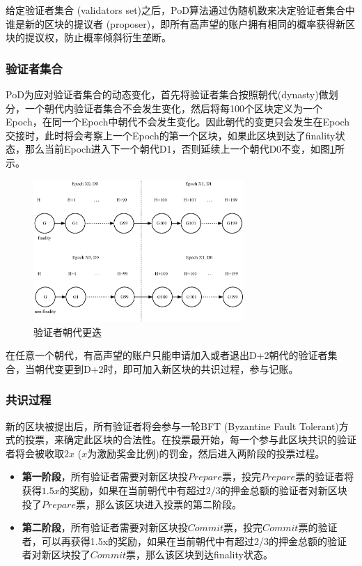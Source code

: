 给定验证者集合 (validators set)之后，PoD算法通过伪随机数来决定验证者集合中谁是新的区块的提议者 (proposer)，即所有高声望的账户拥有相同的概率获得新区块的提议权，防止概率倾斜衍生垄断。

\subsubsection{验证者集合}
\label{PoD:design:validators}

PoD为应对验证者集合的动态变化，首先将验证者集合按照朝代(dynasty)做划分，一个朝代内验证者集合不会发生变化，然后将每100个区块定义为一个Epoch，在同一个Epoch中朝代不会发生变化。因此朝代的变更只会发生在Epoch交接时，此时将会考察上一个Epoch的第一个区块，如果此区块到达了finality状态，那么当前Epoch进入下一个朝代D1，否则延续上一个朝代D0不变，如图\ref{fig:epoch}所示。

\begin{figure}[h]
\centering
\includegraphics[width=8cm]{./figs/epoch}
\caption{验证者朝代更迭}
\label{fig:epoch}
\end{figure}

在任意一个朝代，有高声望的账户只能申请加入或者退出D+2朝代的验证者集合，当朝代变更到D+2时，即可加入新区块的共识过程，参与记账。

\subsubsection{共识过程}
\label{PoD:design:consensus}

新的区块被提出后，所有验证者将会参与一轮BFT (Byzantine Fault Tolerant)方式的投票，来确定此区块的合法性。在投票最开始，每一个参与此区块共识的验证者将会被收取$2x$ ($x$为激励奖金比例)的罚金，然后进入两阶段的投票过程。

\begin{itemize}
\item \textbf{第一阶段}，所有验证者需要对新区块投$Prepare$票，投完$Prepare$票的验证者将获得$1.5x$的奖励，如果在当前朝代中有超过$2/3$的押金总额的验证者对新区块投了$Prepare$票，那么该区块进入投票的第二阶段。

\item \textbf{第二阶段}，所有验证者需要对新区块投$Commit$票，投完$Commit$票的验证者，可以再获得1.5x的奖励，如果在当前朝代中有超过2/3的押金总额的验证者对新区块投了$Commit$票，那么该区块到达finality状态。
\end{itemize}

